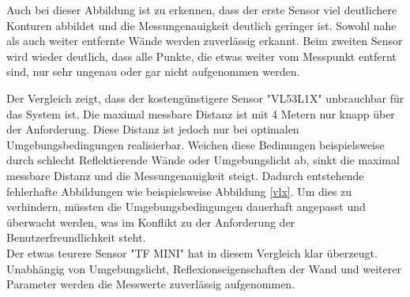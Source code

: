 Auch bei dieser Abbildung ist zu erkennen, dass der erste Sensor viel deutlichere Konturen abbildet und die Messungenauigkeit deutlich geringer ist. Sowohl nahe als auch weiter entfernte Wände werden zuverlässig erkannt. Beim zweiten Sensor wird wieder deutlich, dass alle Punkte, die etwas weiter vom Messpunkt entfernt sind, nur sehr ungenau oder gar nicht aufgenommen werden. 

Der Vergleich zeigt, dass der kostengünstigere Sensor "VL53L1X" unbrauchbar für das System ist. Die maximal messbare Distanz ist mit 4 Metern nur knapp über der Anforderung. Diese Distanz ist jedoch nur bei optimalen Umgebungsbedingungen realisierbar. Weichen diese Bedinungen beispielsweise durch schlecht Reflektierende Wände oder Umgebungslicht ab, sinkt die maximal messbare Distanz und die Messungenauigkeit steigt.  Dadurch entstehende fehlerhafte Abbildungen wie beispielsweise Abbildung \ref*{vlx}. Um dies zu verhindern, müssten die Umgebungsbedingungen dauerhaft angepasst und überwacht werden, was im Konflikt zu der Anforderung der Benutzerfreundlichkeit steht.\\

Der etwas teurere Sensor "TF MINI" hat in diesem Vergleich klar überzeugt. Unabhängig von Umgebungslicht, Reflexionseigenschaften der Wand und weiterer Parameter werden die Messwerte zuverlässig aufgenommen. 







